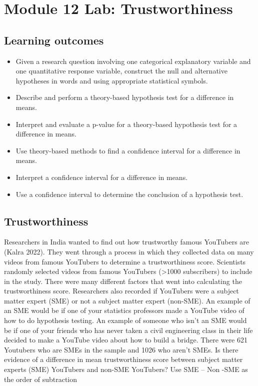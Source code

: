 \documentclass[
]{report}
\begin{document}
\vspace{3in}
\newpage

\section{Module 12 Lab: Trustworthiness}\label{module-12-lab-trustworthiness}


\subsection{Learning outcomes}\label{learning-outcomes-2}

\begin{itemize}
\item
  Given a research question involving one categorical explanatory variable and one quantitative response variable, construct the null and alternative hypotheses
  in words and using appropriate statistical symbols.
\item
  Describe and perform a theory-based hypothesis test for a difference in means.
\item
  Interpret and evaluate a p-value for a theory-based hypothesis test for a difference in means.
\item
  Use theory-based methods to find a confidence interval for a difference in means.
\item
  Interpret a confidence interval for a difference in means.
\item
  Use a confidence interval to determine the conclusion of a hypothesis test.
\end{itemize}

\subsection{Trustworthiness}\label{trustworthiness}

Researchers in India wanted to find out how trustworthy famous YouTubers are (Kalra 2022). They went through a process in which they collected data on many videos from famous YouTubers to determine a trustworthiness score. Scientists randomly selected videos from famous YouTubers (\textgreater1000 subscribers) to include in the study. There were many different factors that went into calculating the trustworthiness score. Researchers also recorded if YouTubers were a subject matter expert (SME) or not a subject matter expert (non-SME). An example of an SME would be if one of your statistics professors made a YouTube video of how to do hypothesis testing. An example of someone who isn't an SME would be if one of your friends who has never taken a civil engineering class in their life decided to make a YouTube video about how to build a bridge. There were 621 Youtubers who are SMEs in the sample and 1026 who aren't SMEs. Is there evidence of a difference in mean trustworthiness score between subject matter experts (SME) YouTubers and non-SME YouTubers? Use SME -- Non -SME as the order of subtraction
\end{document}
